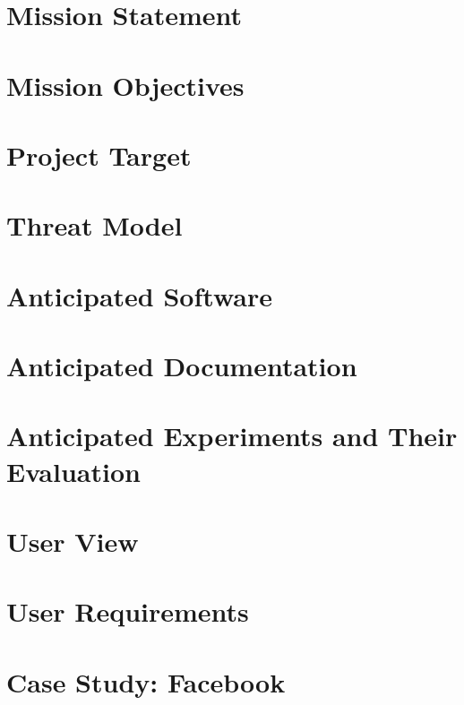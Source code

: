 \chapter{Mission Statement}


\chapter{Mission Objectives}


\chapter{Project Target}


\chapter{Threat Model}


\chapter{Anticipated Software}


\chapter{Anticipated Documentation}


\chapter{Anticipated Experiments and Their Evaluation}


\chapter{User View}


\chapter{User Requirements}


\chapter{Case Study: Facebook}



